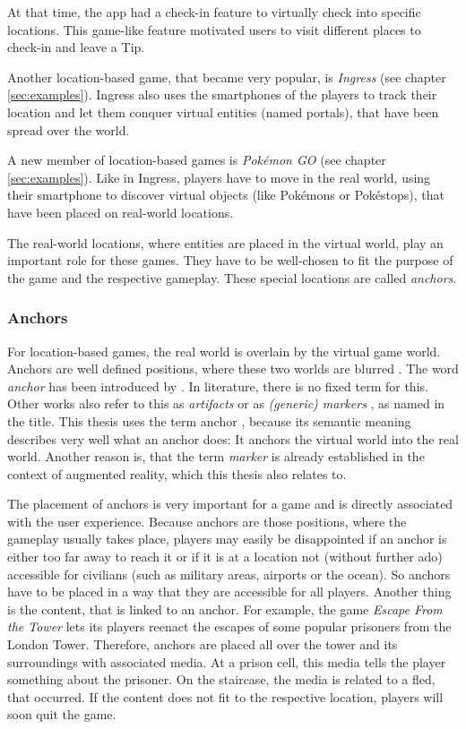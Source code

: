 At that time, the app had a check-in feature to virtually check into specific locations. This game-like feature motivated users to visit different places to check-in and leave a Tip.

Another location-based game, that became very popular, is \emph{Ingress} (see chapter \ref{sec:examples}). Ingress also uses the smartphones of the players to track their location and let them conquer virtual entities (named portals), that have been spread over the world.

A new member of location-based games is \emph{Pok\'{e}mon GO} (see chapter \ref{sec:examples}). Like in Ingress, players have to move in the real world, using their smartphone to discover virtual objects (like Pok\'{e}mons or Pok\'{e}stops), that have been placed on real-world locations.

The real-world locations, where entities are placed in the virtual world, play an important role for these games. They have to be well-chosen to fit the purpose of the game and the respective gameplay. These special locations are called \emph{anchors}.

\subsubsection{Anchors}\label{sec:anchorsStateOfTheArt}
For location-based games, the real world is overlain by the virtual game world. Anchors are well defined positions, where these two worlds are blurred \citep{hock2014augmented}. The word \emph{anchor} has been introduced by \citeauthor{hock2014augmented}. In literature, there is no fixed term for this. Other works also refer to this as \emph{artifacts} \citep{reid2008design} or as \emph{(generic) markers} \citep{matyas2008designing}, as named in the title. This thesis uses the term anchor \citep{hock2014augmented}, because its semantic meaning describes very well what an anchor does: It anchors the virtual world into the real world. Another reason is, that the term \emph{marker} is already established in the context of augmented reality, which this thesis also relates to.

The placement of anchors is very important for a game and is directly associated with the user experience. Because anchors are those positions, where the gameplay usually takes place, players may easily be disappointed if an anchor is either too far away to reach it or if it is at a location not (without further ado) accessible for civilians (such as military areas, airports or the ocean). So anchors have to be placed in a way that they are accessible for all players.
Another thing is the content, that is linked to an anchor. For example, the game \emph{Escape From the Tower} \citep{EscapeFromTheTower} lets its players reenact the escapes of some popular prisoners from the London Tower. Therefore, anchors are placed all over the tower and its surroundings with associated media. At a prison cell, this media tells the player something about the prisoner. On the staircase, the media is related to a fled, that occurred. If the content does not fit to the respective location, players will soon quit the game.

